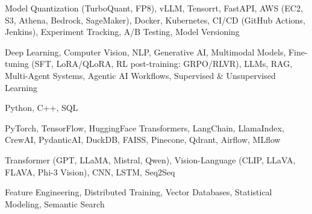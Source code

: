 \documentclass[letter,10pt]{article}
\begin{document}
 Model Quantization (TurboQuant, FP8), vLLM, Tensorrt, FastAPI, AWS (EC2, S3, Athena, Bedrock, SageMaker), Docker, Kubernetes, CI/CD (GitHub Actions, Jenkins), Experiment Tracking, A/B Testing, Model Versioning\par\vspace{2pt}

 Deep Learning, Computer Vision, NLP, Generative AI, Multimodal Models, Fine-tuning (SFT, LoRA/QLoRA, RL post-training: GRPO/RLVR), LLMs, RAG, Multi-Agent Systems, Agentic AI Workflows, Supervised \& Unsupervised Learning\par\vspace{2pt}

 Python, C++, SQL\par\vspace{2pt}

 PyTorch, TensorFlow, HuggingFace Transformers, LangChain, LlamaIndex, CrewAI, PydanticAI, DuckDB, FAISS, Pinecone, Qdrant, Airflow, MLflow\par\vspace{2pt}

 Transformer (GPT, LLaMA, Mistral, Qwen), Vision-Language (CLIP, LLaVA, FLAVA, Phi-3 Vision), CNN, LSTM, Seq2Seq\par\vspace{2pt}

 Feature Engineering, Distributed Training, Vector Databases, Statistical Modeling, Semantic Search
\end{document}
